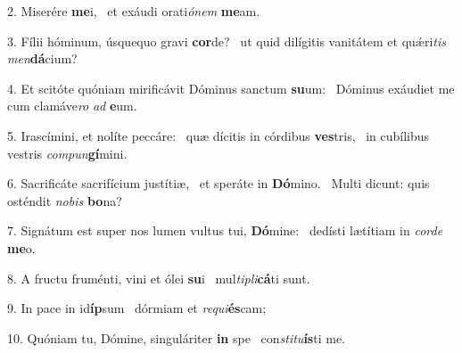 2. Miserére \textbf{me}i, \ast\  et exáudi orati\textit{ó}\textit{nem} \textbf{me}am.\

3. Fílii hóminum, úsquequo gravi \textbf{cor}de? \ast\  ut quid dilígitis vanitátem et quǽri\textit{tis} \textit{men}\textbf{dá}cium?\

4. Et scitóte quóniam mirificávit Dóminus sanctum \textbf{su}um: \ast\  Dóminus exáudiet me cum clamáve\textit{ro} \textit{ad} \textbf{e}um.\

5. Irascímini, et nolíte peccáre: \dag\  quæ dícitis in córdibus \textbf{ves}tris, \ast\  in cubílibus vestris \textit{com}\textit{pun}\textbf{gí}mini.\

6. Sacrificáte sacrifícium justítiæ, \dag\  et speráte in \textbf{Dó}mino. \ast\  Multi dicunt: quis osténdit \textit{no}\textit{bis} \textbf{bo}na?\

7. Signátum est super nos lumen vultus tui, \textbf{Dó}mine: \ast\  dedísti lætítiam in \textit{cor}\textit{de} \textbf{me}o.\

8. A fructu fruménti, vini et ólei \textbf{su}i \ast\  mul\textit{ti}\textit{pli}\textbf{cá}ti sunt.\

9. In pace in id\textbf{íp}sum \ast\  dórmiam et \textit{re}\textit{qui}\textbf{és}cam;\

10. Quóniam tu, Dómine, singuláriter \textbf{in} spe \ast\  con\textit{sti}\textit{tu}\textbf{ís}ti me.\

